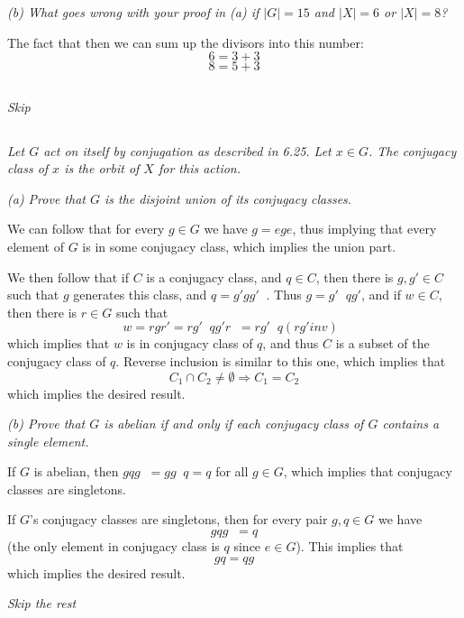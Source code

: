 \documentclass[11pt,oneside,titlepage]{book}
\DeclareMathOperator \inv {^{-1}}
\DeclareMathOperator \ra {\Rightarrow}
\begin{document}
\textit{(b) What goes wrong with your proof in (a) if $|G| = 15$ and
  $|X| = 6$ or $|X| = 8$?}

The fact that then we can sum up the divisors into this number:
$$6 = 3 + 3$$
$$8 = 5 + 3$$

\subsection{}

\textit{Skip}

\subsection{}

\textit{Let $G$ act on itself by conjugation as described in 6.25.
  Let $x \in G$. The conjugacy class of $x$ is the orbit of $X$ for this
  action.}

\textit{(a) Prove that $G$ is the disjoint union of its conjugacy classes.}

We can follow that for every $g \in G$ we have $g = e g e$, thus
implying that every element of $G$ is in some conjugacy class, which
implies the union part.

We then follow that if $C$ is a conjugacy class, and  $q \in C$,
then there is $g, g' \in C$ such that $g$ generates this class,
and $q = g' g g'\inv$. Thus $g = g'\inv q g'$, and if $w \in C$,
then there is $r \in G$ such that
$$w = r g r' = r g'\inv q g' r\inv = r g'\inv q (r g'inv)\inv $$
which implies that $w$ is in conjugacy class of $q$, and thus $C$
is a subset of the conjugacy class of $q$. Reverse inclusion is similar
to this one, which implies that
$$C_1 \cap C_2 \neq \emptyset \ra C_1 = C_2$$
which implies the desired result.

\textit{(b) Prove that $G$ is abelian if and only if each conjugacy class
  of $G$ contains a single element.}

If $G$ is abelian, then $g q g\inv = g g\inv q = q$ for all $g \in G$,
which implies that conjugacy classes are singletons.

If $G$'s conjugacy classes are singletons, then for every pair $g, q \in G$
we have
$$g q g\inv = q$$
(the only element in conjugacy class is $q$ since $e \in G$).
This implies that
$$gq = qg$$
which implies the desired result.

\textit{Skip the rest}

\subsection{}
\end{document}
